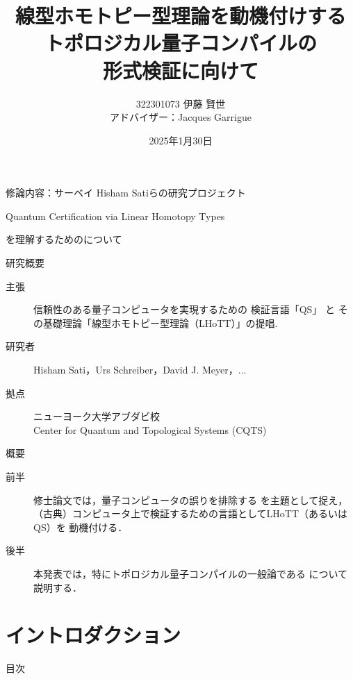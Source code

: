\documentclass{beamer} %
\title[トポロジカル量子コンパイル]{線型ホモトピー型理論を動機付けする\\
トポロジカル量子コンパイルの\\
形式検証に向けて}
\author[322301073 伊藤 賢世]{322301073 伊藤 賢世\\
アドバイザー：Jacques Garrigue}
\date{2025年1月30日}
\newcommand{\0}{\mathbf{0}}
\newcommand{\1}{\mathbf{1}}
\newcommand{\2}{\mathbf{2}}
\begin{document}
\begin{frame}
  \maketitle
\end{frame}

\begin{frame}
  \begin{block}{修論内容：サーベイ}
    Hisham Satiらの研究プロジェクト
    \begin{center}
      Quantum Certification
      via Linear Homotopy Types
    \end{center}
    を理解するためのについて
  \end{block}
  \begin{block}{研究概要}
    \begin{description}
      \item[主張] 信頼性のある量子コンピュータを実現するための
        検証言語「QS」 と
        その基礎理論「線型ホモトピー型理論（LHoTT）」の提唱.
      \item[研究者] Hisham Sati，Urs Schreiber，David J. Meyer，\(\ldots\)
      \item[拠点] ニューヨーク大学アブダビ校\\
        Center for Quantum and
        Topological Systems (CQTS)
    \end{description}
  \end{block}
\end{frame}


\begin{frame}
  \begin{block}{概要}
    \begin{description}
      \item[前半] 修士論文では，量子コンピュータの誤りを排除する
        を主題として捉え，
        （古典）コンピュータ上で検証するための言語としてLHoTT（あるいはQS）を
        動機付ける．
      \item[後半] 本発表では，特にトポロジカル量子コンパイルの一般論である
        について説明する．
    \end{description}
  \end{block}
\end{frame}

\section{イントロダクション}
\begin{frame}[noframenumbering]{目次}
  \tableofcontents[currentsection]
\end{frame}
\end{document}
